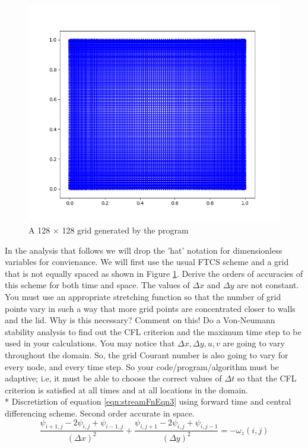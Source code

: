 \documentclass{article}
\begin{document}
\begin{figure}[h!]
\centering
\includegraphics[scale=.5]{Figure_1.png}
\caption{A 128 $\times$ 128 grid generated by the program}
\label{fig:gridImage}
\end{figure}
In the analysis that follows we will drop the 'hat' notation for dimensionless variables for convienance. We will first use the usual FTCS scheme and a grid that is not equally spaced as shown in Figure \ref{fig:gridImage}. Derive the orders of accuracies of this scheme for both time and space. The values of $\Delta x$ and $\Delta y$ are not constant. You must use an appropriate stretching function so that the number of grid points vary in such a way that more grid points are concentrated closer to walls and the lid. Why is this necessary? Comment on this! Do a Von-Neumann stability analysis to find out the CFL criterion and the maximum time step to be used in your calculations. You may notice that $\Delta x,\Delta y,u,v$ are going to vary throughout the domain. So, the grid Courant number is also going to vary for every node, and every time step. So your code/program/algorithm must be adaptive; i.e, it must be able to choose the correct values of $\Delta t$ so that the CFL criterion is satisfied at all times and at all locations in the domain.
\\*
Discretiztion of equation \ref{eqn:streamFnEqn3} using forward time and central differencing scheme. Second order accurate in space.
\begin{equation}
\frac{\psi_{i+1,j}-2\psi_{i,j}+\psi_{i-1,j} }{(\Delta x)^2} + \frac{\psi_{i,j+1}-2\psi_{i,j}+\psi_{i,j-1}}{(\Delta y)^2} = -\omega_z(i,j)
\end{equation}
\end{document}
